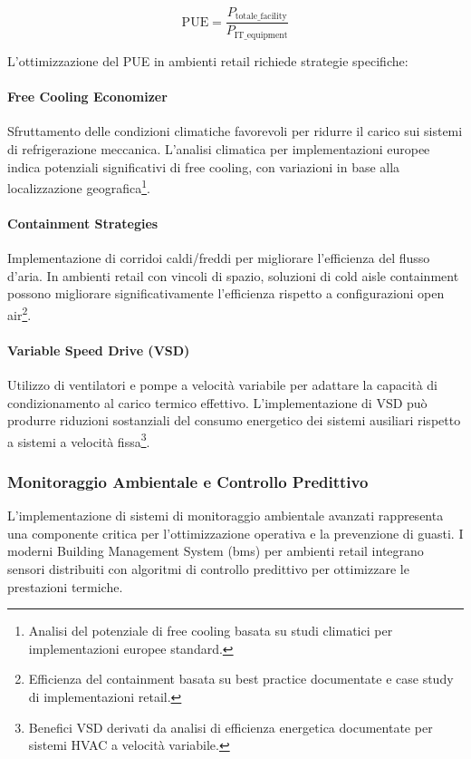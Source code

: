 \begin{equation}
\text{PUE} = \frac{P_{\text{totale\_facility}}}{P_{\text{IT\_equipment}}}
\label{eq:pue}
\end{equation}

L'ottimizzazione del PUE in ambienti retail richiede strategie specifiche:

\paragraph{Free Cooling Economizer}
Sfruttamento delle condizioni climatiche favorevoli per ridurre il carico sui sistemi di refrigerazione meccanica. L'analisi climatica per implementazioni europee indica potenziali significativi di free cooling, con variazioni in base alla localizzazione geografica\footnote{Analisi del potenziale di free cooling basata su studi climatici per implementazioni europee standard.}.

\paragraph{Containment Strategies}
Implementazione di corridoi caldi/freddi per migliorare l'efficienza del flusso d'aria. In ambienti retail con vincoli di spazio, soluzioni di cold aisle containment possono migliorare significativamente l'efficienza rispetto a configurazioni open air\footnote{Efficienza del containment basata su best practice documentate e case study di implementazioni retail.}.

\paragraph{Variable Speed Drive (VSD)}
Utilizzo di ventilatori e pompe a velocità variabile per adattare la capacità di condizionamento al carico termico effettivo. L'implementazione di VSD può produrre riduzioni sostanziali del consumo energetico dei sistemi ausiliari rispetto a sistemi a velocità fissa\footnote{Benefici VSD derivati da analisi di efficienza energetica documentate per sistemi HVAC a velocità variabile.}.

\subsubsection{Monitoraggio Ambientale e Controllo Predittivo}

L'implementazione di sistemi di monitoraggio ambientale avanzati rappresenta una componente critica per l'ottimizzazione operativa e la prevenzione di guasti. I moderni Building Management System (\gls{bms}) per ambienti retail integrano sensori distribuiti con algoritmi di controllo predittivo per ottimizzare le prestazioni termiche.

